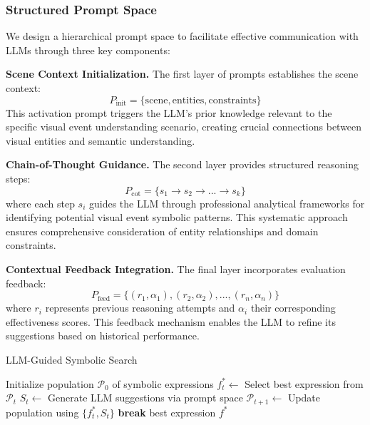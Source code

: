 \subsubsection{Structured Prompt Space}
We design a hierarchical prompt space to facilitate effective communication with LLMs through three key components:\par
\noindent
\textbf{Scene Context Initialization.} The first layer of prompts establishes the scene context:
\begin{equation}
    P_{\text{init}} = \{\text{scene}, \text{entities}, \text{constraints}\}
\end{equation}
This activation prompt triggers the LLM's prior knowledge relevant to the specific visual event understanding scenario, creating crucial connections between visual entities and semantic understanding.\par
\noindent
\textbf{Chain-of-Thought Guidance.} The second layer provides structured reasoning steps:
\begin{equation}
    P_{\text{cot}} = \{s_1 \rightarrow s_2 \rightarrow ... \rightarrow s_k\}
\end{equation}
where each step $s_i$ guides the LLM through professional analytical frameworks for identifying potential visual event symbolic patterns. This systematic approach ensures comprehensive consideration of entity relationships and domain constraints. \par
\noindent
\textbf{Contextual Feedback Integration.} The final layer incorporates evaluation feedback:
\begin{equation}
    P_{\text{feed}} = \{(r_1, \alpha_1), (r_2, \alpha_2), ..., (r_n, \alpha_n)\}
\end{equation}
where $r_i$ represents previous reasoning attempts and $\alpha_i$ their corresponding effectiveness scores. This feedback mechanism enables the LLM to refine its suggestions based on historical performance.
% 
\begin{algorithm}[t]
\caption{LLM-Guided Symbolic Search}
\begin{algorithmic}[1]
\STATE Initialize population $\mathcal{P}_0$ of symbolic expressions
    \STATE $f_t^* \gets$ Select best expression from $\mathcal{P}_t$
    \STATE $S_t \gets$ Generate LLM suggestions via prompt space
    \STATE $\mathcal{P}_{t+1} \gets$ Update population using $\{f_t^*, S_t\}$
        \STATE \textbf{break}
    \ENDIF
\ENDFOR
\RETURN best expression $f^*$
\end{algorithmic}
\end{algorithm}
% 
